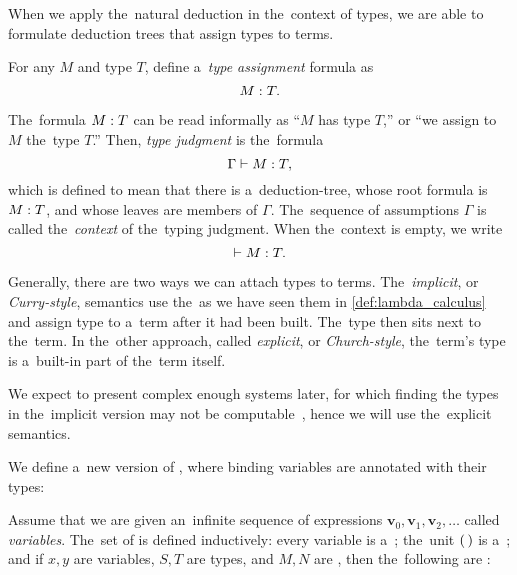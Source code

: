 
When we apply the~natural deduction in the~context of types, we are able to
formulate deduction trees that assign types to terms.

\begin{definition}
  For any \lt $M$ and type $T$, define a~\emph{type assignment} formula as
  \[
    M \overset{}: T.
  \]
\end{definition}

The~formula $M \overset{}: T$ can be read informally as ``$M$ has type $T$,'' or ``we
assign to $M$ the~type $T$.'' Then, \emph{type judgment} is the~formula
\[
  \Gamma \vdash M \overset{}: T,
\]
which is defined to mean that there is a~deduction-tree, whose root formula is
$M \overset{}: T$, and whose leaves are members of $\Gamma$. The~sequence of
assumptions $\Gamma$ is called the~\emph{context} of the~typing judgment. When
the~context is empty, we write
\[
  \vdash M \overset{}: T.
\]

\label{sec:stlc}

Generally, there are two ways we can attach types to terms. The~\emph{implicit},
or \emph{Curry-style}, semantics use the~\lts as we have seen them in
\autoref{def:lambda_calculus} and assign type to a~term after it had been built.
The~type then sits next to the~term. In the~other approach, called
\emph{explicit}, or \emph{Church-style}, the~term's type is a~built-in part of
the~term itself.

We expect to present complex enough systems later, for which finding the types
in the~implicit version may not be computable~\citep{wells_1999}, hence we will
use the~explicit semantics.

We define a~new version of \lts, where binding variables are annotated with
their types:
\begin{definition}\label{def:stlc}
  Assume that we are given an~infinite sequence of expressions $\mathbf{v}_0,
  \mathbf{v}_1, \mathbf{v}_2, \dots$ called \emph{variables}. The~set of
  \emph{\lts} is defined inductively: every variable is a~\lt; the~unit $( \, )$
  is a~\lt; and if $x, y$ are variables, $S, T$ are types, and $M, N$ are \lts,
  then the~following are \lts:
\end{definition}

